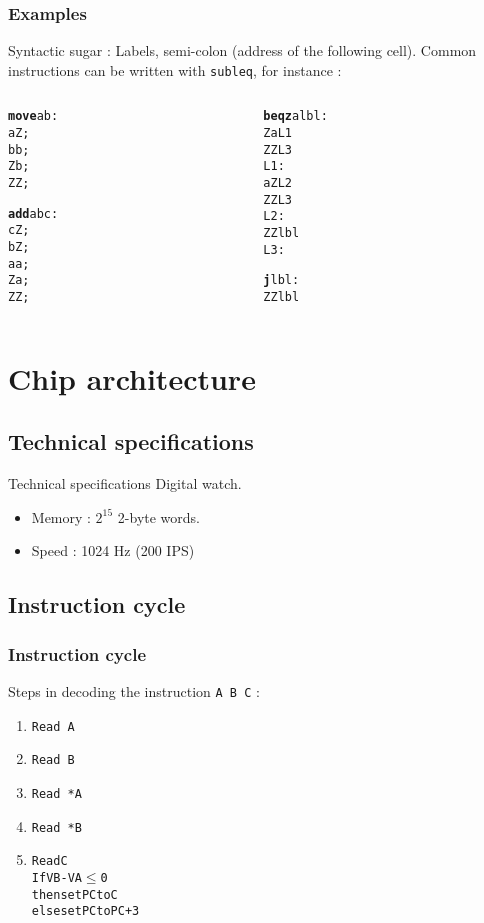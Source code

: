 \documentclass{beamer}
\begin{document}
\begin{frame}[fragile]
    \frametitle{Examples}
Syntactic sugar : Labels, semi-colon (address of the following cell).
Common instructions can be written with \texttt{subleq}, for instance :

\begin{columns}[t]
  \begin{column}[T]{3cm}
    \begin{alltt}
{\bf move} a b :
   a Z ;
   b b ;
   Z b ;
   Z Z ;

{\bf add} a b c :
   c Z ;
   b Z ;
   a a ;
   Z a ;
   Z Z ;
    \end{alltt}
  \end{column}
  \begin{column}[T]{3cm}
    \begin{alltt}
{\bf beqz} a lbl :
   	Z a L1
   	Z Z L3
 L1:
    a Z L2
    Z Z L3
 L2:
    Z Z lbl
 L3:

{\bf j} lbl :
    Z Z lbl
    \end{alltt}
  \end{column}
  \end{columns}
\end{frame}


\section{Chip architecture}
\subsection{Technical specifications}

\begin{frame}{Technical specifications}
  Digital watch.
  \begin{itemize}
    \item Memory : $2^{15}$ 2-byte words.
    \item Speed : 1024 Hz (200 IPS)
  \end{itemize}
\end{frame}

\subsection{Instruction cycle}

\begin{frame}[fragile]
  \frametitle{Instruction cycle}
  Steps in decoding the instruction \verb=A B C= :
      \begin{enumerate}
        \item<2-> \verb=Read A=
        \item<3-> \verb=Read B=
        \item<4-> \verb=Read *A=
        \item<5-> \verb=Read *B=
        \item<6->
          \begin{alltt}
Read C
If VB - VA \(\leq\) 0
  then set PC to C
else set PC to PC+3
          \end{alltt}
      \end{enumerate}
\end{frame}
\end{document}

